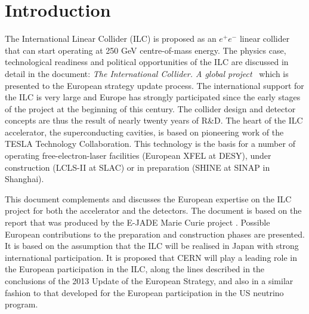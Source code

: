 \documentclass[%
 reprint,
 floatfix,
 amsmath,amssymb,
 aps,
]{revtex4-1}
\def\ee{e^+e^-}
\begin{document}
\pagebreak

\pagestyle{plain}
\setcounter{page}{1}

\twocolumngrid

\section{\label{sec:intro}Introduction}

The International Linear Collider (ILC) is proposed as an $\ee$ linear collider that can start operating at  250 GeV centre-of-mass energy. The physics case, technological readiness and political opportunities of the ILC are discussed in detail in the document: \emph{The International Collider. A global project}~\cite{ILCESU1} which is presented to the European strategy update process. The international  support for the ILC is very large and Europe has strongly participated since the early stages of the project at the beginning of this century.   The collider design and detector concepts are thus the result of nearly twenty years of R\&D. The heart of the ILC accelerator, the superconducting cavities, is based on pioneering work of the TESLA Technology Collaboration. This technology is the basis for a number of operating free-electron-laser facilities (European XFEL at DESY), under construction (LCLS-II at SLAC) or in preparation (SHINE at SINAP in Shanghai).

This document complements \cite{ILCESU1} and discusses the European expertise on the ILC project for both the accelerator and the detectors. The document is based on the report \cite{ejade-report} that was produced by the E-JADE Marie Curie project \cite{ejade}. Possible European contributions to the preparation and construction phases are presented. It is based on the assumption that the ILC will be realised in Japan with strong international participation. 
It is proposed that CERN will play a leading role in the European participation in the ILC, along the lines described in the  conclusions of the 2013 Update of the European Strategy, and also in a similar fashion to that  developed for the European participation in the US neutrino program.  
\end{document}
